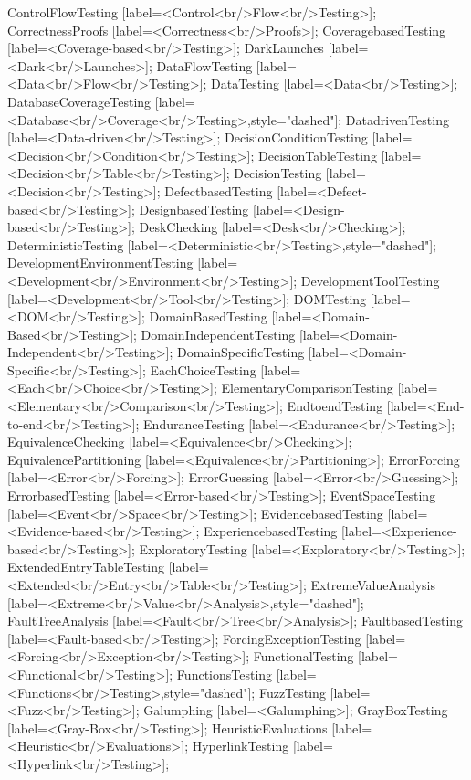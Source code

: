 \documentclass{article}
\begin{document}
{ControlFlowTesting [label=<Control<br/>Flow<br/>Testing>];
CorrectnessProofs [label=<Correctness<br/>Proofs>];
CoveragebasedTesting [label=<Coverage-based<br/>Testing>];
DarkLaunches [label=<Dark<br/>Launches>];
DataFlowTesting [label=<Data<br/>Flow<br/>Testing>];
DataTesting [label=<Data<br/>Testing>];
DatabaseCoverageTesting [label=<Database<br/>Coverage<br/>Testing>,style="dashed"];
DatadrivenTesting [label=<Data-driven<br/>Testing>];
DecisionConditionTesting [label=<Decision<br/>Condition<br/>Testing>];
DecisionTableTesting [label=<Decision<br/>Table<br/>Testing>];
DecisionTesting [label=<Decision<br/>Testing>];
DefectbasedTesting [label=<Defect-based<br/>Testing>];
DesignbasedTesting [label=<Design-based<br/>Testing>];
DeskChecking [label=<Desk<br/>Checking>];
DeterministicTesting [label=<Deterministic<br/>Testing>,style="dashed"];
DevelopmentEnvironmentTesting [label=<Development<br/>Environment<br/>Testing>];
DevelopmentToolTesting [label=<Development<br/>Tool<br/>Testing>];
DOMTesting [label=<DOM<br/>Testing>];
DomainBasedTesting [label=<Domain-Based<br/>Testing>];
DomainIndependentTesting [label=<Domain-Independent<br/>Testing>];
DomainSpecificTesting [label=<Domain-Specific<br/>Testing>];
EachChoiceTesting [label=<Each<br/>Choice<br/>Testing>];
ElementaryComparisonTesting [label=<Elementary<br/>Comparison<br/>Testing>];
EndtoendTesting [label=<End-to-end<br/>Testing>];
EnduranceTesting [label=<Endurance<br/>Testing>];
EquivalenceChecking [label=<Equivalence<br/>Checking>];
EquivalencePartitioning [label=<Equivalence<br/>Partitioning>];
ErrorForcing [label=<Error<br/>Forcing>];
ErrorGuessing [label=<Error<br/>Guessing>];
ErrorbasedTesting [label=<Error-based<br/>Testing>];
EventSpaceTesting [label=<Event<br/>Space<br/>Testing>];
EvidencebasedTesting [label=<Evidence-based<br/>Testing>];
ExperiencebasedTesting [label=<Experience-based<br/>Testing>];
ExploratoryTesting [label=<Exploratory<br/>Testing>];
ExtendedEntryTableTesting [label=<Extended<br/>Entry<br/>Table<br/>Testing>];
ExtremeValueAnalysis [label=<Extreme<br/>Value<br/>Analysis>,style="dashed"];
FaultTreeAnalysis [label=<Fault<br/>Tree<br/>Analysis>];
FaultbasedTesting [label=<Fault-based<br/>Testing>];
ForcingExceptionTesting [label=<Forcing<br/>Exception<br/>Testing>];
FunctionalTesting [label=<Functional<br/>Testing>];
FunctionsTesting [label=<Functions<br/>Testing>,style="dashed"];
FuzzTesting [label=<Fuzz<br/>Testing>];
Galumphing [label=<Galumphing>];
GrayBoxTesting [label=<Gray-Box<br/>Testing>];
HeuristicEvaluations [label=<Heuristic<br/>Evaluations>];
HyperlinkTesting [label=<Hyperlink<br/>Testing>];
}
\end{document}
